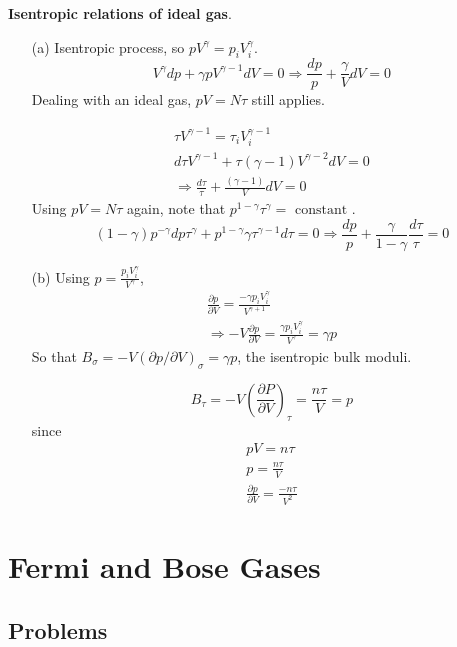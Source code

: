 \documentclass[twoside]{amsart}
\theoremstyle{plain}
\theoremstyle{definition}
\newcommand{\solutionhead}[1]
  {
   \noindent{\small\bf Solution #1.}
   }
\begin{document}
\solutionhead{10}  \textbf{Isentropic relations of ideal gas}. 
\begin{itemize}
\item[(a)] 
Isentropic process, so $pV^{\gamma} = p_i V_i^{\gamma}$.  
\[
V^{ \gamma} dp + \gamma p V^{\gamma -1} dV = 0 \Longrightarrow \boxed{ \frac{dp}{p} + \frac{ \gamma}{ V} dV = 0 }
\]
Dealing with an ideal gas, $pV = N\tau$ still applies.  

\[
\begin{gathered}
  \tau V^{\gamma - 1 } = \tau_i V_i^{\gamma -1 } \\ 
  d\tau V^{\gamma - 1 } + \tau (\gamma - 1 ) V^{\gamma - 2 } dV = 0 \\
\Longrightarrow \boxed{   \frac{d\tau}{\tau} + \frac{ (\gamma - 1)}{ V} dV = 0  }
\end{gathered}
\]
Using $pV = N\tau$ again, note that $p^{1- \gamma} \tau^{\gamma} = \text{ constant }$.  
\[
(1- \gamma ) p^{-\gamma} dp \tau^{\gamma} + p^{1-\gamma} \gamma \tau^{\gamma - 1} d\tau =0 \Longrightarrow \boxed{ \frac{dp }{p} + \frac{ \gamma}{ 1 - \gamma} \frac{d\tau}{ \tau} = 0 }
\]
\item[(b)] Using $p = \frac{ p_i V_i^{\gamma}}{ V^{\gamma}}$, 
\[
\begin{gathered}
  \frac{ \partial p}{ \partial V} = \frac{- \gamma p_i V_i^{\gamma}}{ V^{\gamma + 1 } } \\
  \Longrightarrow -V \frac{ \partial p }{ \partial V} = \frac{ \gamma p_i V_i^{\gamma} }{V^{\gamma}} =  \gamma p
\end{gathered}
\]
So that $B_{\sigma} = -V(\partial p/ \partial V)_{\sigma} = \gamma p$, the isentropic bulk moduli.  

\[
B_{\tau} = -V \left( \frac{ \partial P }{ \partial V} \right)_{\tau} = \frac{ n \tau}{V} = p
\]
since 
\[
\begin{gathered}
  pV = n\tau \\ 
  p = \frac{ n \tau}{V} \\
  \frac{ \partial p}{\partial V} = \frac{- n \tau}{ V^2}
\end{gathered}
\]
\end{itemize}

\section{Fermi and Bose Gases}

\subsection*{Problems}
\end{document}
